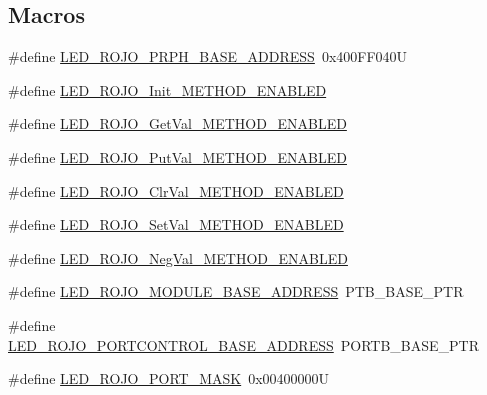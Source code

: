 \subsection*{Macros}
\begin{DoxyCompactItemize}
\item 
\#define \hyperlink{group___l_e_d___r_o_j_o__module_gadec68644cadcfc04aea84412377b3f30}{L\+E\+D\+\_\+\+R\+O\+J\+O\+\_\+\+P\+R\+P\+H\+\_\+\+B\+A\+S\+E\+\_\+\+A\+D\+D\+R\+E\+SS}~0x400\+F\+F040U
\item 
\#define \hyperlink{group___l_e_d___r_o_j_o__module_ga643f7582d425fad56e8ca0fc94a94645}{L\+E\+D\+\_\+\+R\+O\+J\+O\+\_\+\+Init\+\_\+\+M\+E\+T\+H\+O\+D\+\_\+\+E\+N\+A\+B\+L\+ED}
\item 
\#define \hyperlink{group___l_e_d___r_o_j_o__module_ga2acf59737ee845f26c9f2cb5f6fd97b7}{L\+E\+D\+\_\+\+R\+O\+J\+O\+\_\+\+Get\+Val\+\_\+\+M\+E\+T\+H\+O\+D\+\_\+\+E\+N\+A\+B\+L\+ED}
\item 
\#define \hyperlink{group___l_e_d___r_o_j_o__module_gadf6614c1a479bcee3d44b98bafdc16a7}{L\+E\+D\+\_\+\+R\+O\+J\+O\+\_\+\+Put\+Val\+\_\+\+M\+E\+T\+H\+O\+D\+\_\+\+E\+N\+A\+B\+L\+ED}
\item 
\#define \hyperlink{group___l_e_d___r_o_j_o__module_ga634d1a0c4e3ba9512cefc212b42e26ee}{L\+E\+D\+\_\+\+R\+O\+J\+O\+\_\+\+Clr\+Val\+\_\+\+M\+E\+T\+H\+O\+D\+\_\+\+E\+N\+A\+B\+L\+ED}
\item 
\#define \hyperlink{group___l_e_d___r_o_j_o__module_gaf5aa17885742bd00ce6d32388457b7d5}{L\+E\+D\+\_\+\+R\+O\+J\+O\+\_\+\+Set\+Val\+\_\+\+M\+E\+T\+H\+O\+D\+\_\+\+E\+N\+A\+B\+L\+ED}
\item 
\#define \hyperlink{group___l_e_d___r_o_j_o__module_gac52b0da514fa1a10b14164588b5d9deb}{L\+E\+D\+\_\+\+R\+O\+J\+O\+\_\+\+Neg\+Val\+\_\+\+M\+E\+T\+H\+O\+D\+\_\+\+E\+N\+A\+B\+L\+ED}
\item 
\#define \hyperlink{group___l_e_d___r_o_j_o__module_gadb5357fe29bfc41b8ddc3303ea8c0570}{L\+E\+D\+\_\+\+R\+O\+J\+O\+\_\+\+M\+O\+D\+U\+L\+E\+\_\+\+B\+A\+S\+E\+\_\+\+A\+D\+D\+R\+E\+SS}~P\+T\+B\+\_\+\+B\+A\+S\+E\+\_\+\+P\+TR
\item 
\#define \hyperlink{group___l_e_d___r_o_j_o__module_gab980668917d413e73e35cb21cbf4a046}{L\+E\+D\+\_\+\+R\+O\+J\+O\+\_\+\+P\+O\+R\+T\+C\+O\+N\+T\+R\+O\+L\+\_\+\+B\+A\+S\+E\+\_\+\+A\+D\+D\+R\+E\+SS}~P\+O\+R\+T\+B\+\_\+\+B\+A\+S\+E\+\_\+\+P\+TR
\item 
\#define \hyperlink{group___l_e_d___r_o_j_o__module_gab9f5d52fee663e6f3d572e2c7fe0576c}{L\+E\+D\+\_\+\+R\+O\+J\+O\+\_\+\+P\+O\+R\+T\+\_\+\+M\+A\+SK}~0x00400000U
\end{DoxyCompactItemize}
